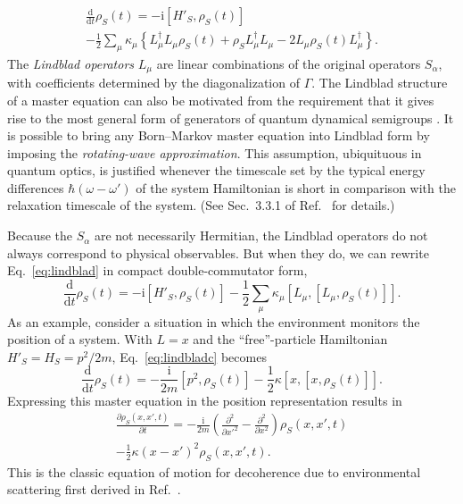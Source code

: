 \documentclass[aps,pra,reprint,amsmath,amssymb,showpacs,nofootinbib,floatfix,onecolumn,12pt]{revtex4-1}
\newcommand{\D}{\text{d}}
\newcommand{\I}{\text{i}}
\begin{document}
%
\begin{multline}\label{eq:lindblad}
  \frac{\D}{\D t} \rho_S(t) = - \I \left[ H'_S, \rho_S(t) \right]  \\- \frac{1}{2} \sum_\mu \kappa_\mu \left\{ L_\mu^\dagger
    L_\mu \rho_S(t) + \rho_S L_\mu^\dagger L_\mu - 2L_\mu \rho_S(t) L_\mu^\dagger \right\}.
\end{multline}
%
The \emph{Lindblad operators} $L_\mu$ are linear combinations of the original operators $S_\alpha$, with coefficients determined by the diagonalization of $\Gamma$. The Lindblad structure of a master equation can also be motivated from the requirement that it gives rise to the most general form of generators of quantum dynamical semigroups \cite{Lindblad:1976:um,Gorini:1976:tt,Gorini:1978:uf,Davies:1974:tw,Kossakowski:1972:tf, Breuer:2002:oq,Alicki:2007:uu}. It is possible to bring any Born--Markov master equation into Lindblad form by imposing the \emph{rotating-wave approximation}. This assumption, ubiquituous in quantum optics, is justified whenever the timescale set by the typical energy differences $\hbar(\omega-\omega')$ of the system Hamiltonian is short in comparison with the relaxation timescale of the system. (See Sec.~3.3.1 of Ref.~\cite{Breuer:2002:oq} for details.) 

Because the $S_\alpha$ are not necessarily Hermitian, the Lindblad operators do not always correspond to physical observables. But when they do, we can rewrite Eq.~\eqref{eq:lindblad} in compact double-commutator form,
%
\begin{equation}\label{eq:lindbladc}
\frac{\D}{\D t} \rho_S(t) = - \I \left[ H'_S, \rho_S(t) \right] - \frac{1}{2} \sum_\mu \kappa_\mu \left[ L_\mu, \left[ L_\mu, \rho_S(t) \right]
\right].
\end{equation}
%
As an example, consider a situation in which the environment monitors the position of a system. With $L = x$ and the ``free''-particle Hamiltonian $H'_S = H_S = p^2/2m$, Eq.~\eqref{eq:lindbladc} becomes
%
\begin{equation}\label{eq:lifsfdndbladc}
\frac{\D}{\D t} \rho_S(t) =  -\frac{\I}{2m}\left[p^2, \rho_S(t) \right] - \frac{1}{2}  \kappa \left[ x, \left[ x, \rho_S(t) \right]\right].
\end{equation}
%
Expressing this master equation in the position representation results in
%
\begin{multline}\label{eq:lifsshvgvvvxayhcgiefdndbladc}
  \frac{\partial \rho_S(x,x',t)}{\partial t} = - \frac{\I}{2m} \left(\frac{ \partial^2}{\partial x'^2}- \frac{ \partial^2}{\partial x^2} \right) \rho_S(x,x',t)\\ -  \frac{1}{2}  \kappa
  \left(x-x'\right)^2   \rho_S(x,x',t).
\end{multline}
%
This is the classic equation of motion for decoherence due to environmental scattering first derived in Ref.~\cite{Joos:1985:iu}.
\end{document}
